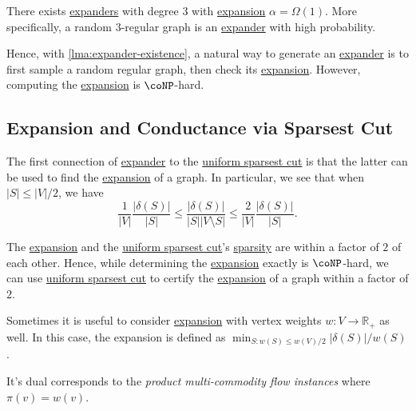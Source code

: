 \begin{lemma}\label{lma:expander-existence}
	There exists \hyperref[def:expander]{expanders} with degree \(3\) with \hyperref[def:expansion]{expansion} \(\alpha = \Omega (1)\). More specifically, a random \(3\)-regular graph is an \hyperref[def:expander]{expander} with high probability.
\end{lemma}

Hence, with \autoref{lma:expander-existence}, a natural way to generate an \hyperref[def:expander]{expander} is to first sample a random regular graph, then check its \hyperref[def:expansion]{expansion}. However, computing the \hyperref[def:expansion]{expansion} is \(\coNP\)-hard.

\subsection{Expansion and Conductance via Sparsest Cut}
The first connection of \hyperref[def:expander]{expander} to the \hyperref[prb:sparsest-cut]{uniform sparsest cut} is that the latter can be used to find the \hyperref[def:expansion]{expansion} of a graph. In particular, we see that when \(\lvert S \rvert \leq \lvert V \rvert / 2\), we have
\[
	\frac{1}{\lvert V \rvert } \frac{\lvert \delta (S) \rvert }{\lvert S \rvert }
	\leq \frac{\lvert \delta (S) \rvert }{\lvert S \rvert \lvert V \setminus S \rvert }
	\leq \frac{2}{\lvert V \rvert } \frac{\lvert \delta (S) \rvert }{\lvert S \rvert }.
\]

\begin{remark}\label{rmk:expansion-sparsity}
	The \hyperref[def:expansion]{expansion} and the \hyperref[prb:sparsest-cut]{uniform sparsest cut}'s \hyperref[def:sparsity]{sparsity} are within a factor of \(2\) of each other. Hence, while determining the \hyperref[def:expansion]{expansion} exactly is \(\coNP\)-hard, we can use \hyperref[prb:sparsest-cut]{uniform sparsest cut} to certify the \hyperref[def:expansion]{expansion} of a graph within a factor of \(2\).
\end{remark}

Sometimes it is useful to consider \hyperref[def:expansion]{expansion} with vertex weights \(w \colon V \to \mathbb{R} _{+}\) as well. In this case, the expansion is defined as \(\min _{S \colon w(S) \leq w(V) / 2} \lvert \delta (S) \rvert / w(S)\).

\begin{note}
	It's dual corresponds to the \emph{product multi-commodity flow instances} where \(\pi (v) = w(v)\).
\end{note}

